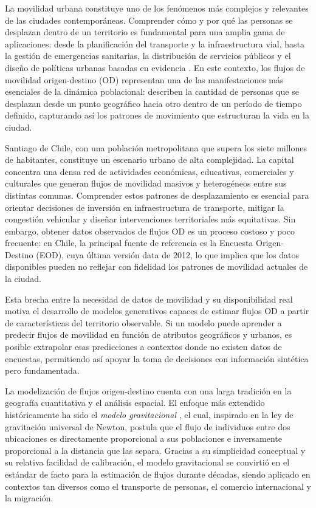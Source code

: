 
La movilidad urbana constituye uno de los fenómenos más complejos y relevantes de las ciudades contemporáneas. Comprender cómo y por qué las personas se desplazan dentro de un territorio es fundamental para una amplia gama de aplicaciones: desde la planificación del transporte y la infraestructura vial, hasta la gestión de emergencias sanitarias, la distribución de servicios públicos y el diseño de políticas urbanas basadas en evidencia \cite{liu2024interdisciplinary}. En este contexto, los flujos de movilidad origen-destino (OD) representan una de las manifestaciones más esenciales de la dinámica poblacional: describen la cantidad de personas que se desplazan desde un punto geográfico hacia otro dentro de un período de tiempo definido, capturando así los patrones de movimiento que estructuran la vida en la ciudad.

Santiago de Chile, con una población metropolitana que supera los siete millones de habitantes, constituye un escenario urbano de alta complejidad. La capital concentra una densa red de actividades económicas, educativas, comerciales y culturales que generan flujos de movilidad masivos y heterogéneos entre sus distintas comunas. Comprender estos patrones de desplazamiento es esencial para orientar decisiones de inversión en infraestructura de transporte, mitigar la congestión vehicular y diseñar intervenciones territoriales más equitativas. Sin embargo, obtener datos observados de flujos OD es un proceso costoso y poco frecuente: en Chile, la principal fuente de referencia es la Encuesta Origen-Destino (EOD), cuya última versión data de 2012, lo que implica que los datos disponibles pueden no reflejar con fidelidad los patrones de movilidad actuales de la ciudad.

Esta brecha entre la necesidad de datos de movilidad y su disponibilidad real motiva el desarrollo de modelos generativos capaces de estimar flujos OD a partir de características del territorio observable. Si un modelo puede aprender a predecir flujos de movilidad en función de atributos geográficos y urbanos, es posible extrapolar esas predicciones a contextos donde no existen datos de encuestas, permitiendo así apoyar la toma de decisiones con información sintética pero fundamentada.

La modelización de flujos origen-destino cuenta con una larga tradición en la geografía cuantitativa y el análisis espacial. El enfoque más extendido históricamente ha sido el \textit{modelo gravitacional} \cite{zipf1946p}, el cual, inspirado en la ley de gravitación universal de Newton, postula que el flujo de individuos entre dos ubicaciones es directamente proporcional a sus poblaciones e inversamente proporcional a la distancia que las separa. Gracias a su simplicidad conceptual y su relativa facilidad de calibración, el modelo gravitacional se convirtió en el estándar de facto para la estimación de flujos durante décadas, siendo aplicado en contextos tan diversos como el transporte de personas, el comercio internacional y la migración.

